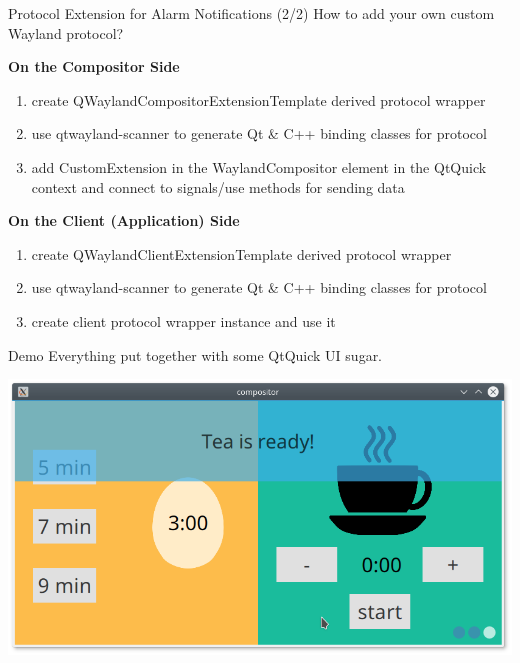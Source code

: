 \documentclass[ucs,9pt]{beamer}
\begin{document}
\begin{frame}[fragile]
    {Protocol Extension for Alarm Notifications (2/2)}
    {How to add your own custom Wayland protocol?}

    \textbf{On the Compositor Side}
    \begin{enumerate}
        \item create QWaylandCompositorExtensionTemplate derived protocol wrapper
        \item use qtwayland-scanner to generate Qt \& C++ binding classes for protocol
        \item add CustomExtension in the WaylandCompositor element in the QtQuick context and connect to signals/use methods for sending data
    \end{enumerate}
    \bigskip

    \textbf{On the Client (Application) Side}
    \begin{enumerate}
        \item create QWaylandClientExtensionTemplate derived protocol wrapper
        \item use qtwayland-scanner to generate Qt \& C++ binding classes for protocol
        \item create client protocol wrapper instance and use it
    \end{enumerate}

\end{frame}

\begin{frame}
    {Demo}
    {Everything put together with some QtQuick UI sugar.}

    \begin{center}
        \includegraphics[width=\linewidth]{demo_screenshot.png}
    \end{center}
\end{frame}
\end{document}
